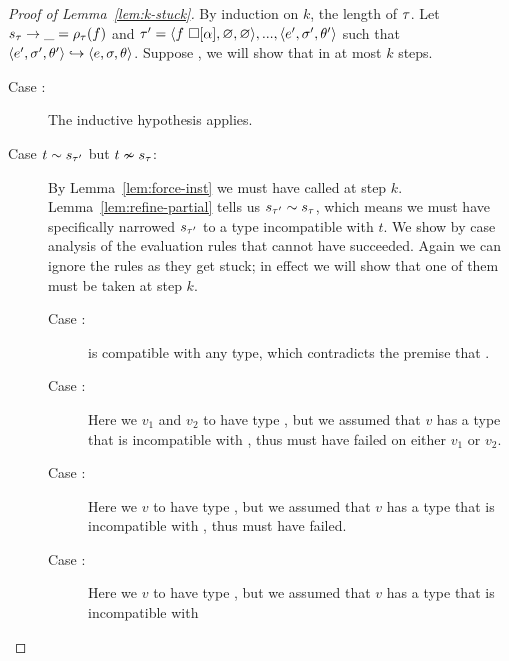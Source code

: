\begin{proof}[Proof of Lemma~\ref{lem:k-stuck}]
  By induction on $k$, the length of $\tau$. Let $s_{\tau} \rightarrow \_ = \rho_{\tau}(f)$ and
  $\tau' = \langle f\ \square[\alpha], \varnothing, \varnothing \rangle,...,\langle e', \sigma', \theta' \rangle$
  such that $\langle e', \sigma', \theta' \rangle \hookrightarrow \langle e, \sigma, \theta \rangle$.
  Suppose , we
  will show that 
  in at most $k$ steps.


  \begin{description}
  \item [Case :]
    The inductive hypothesis applies.
  \item [Case $t \sim s_{\tau'}$ but $t \nsim s_{\tau}$:]
    By Lemma~\ref{lem:force-inst} we must have called \forcesym at step
    $k$.
    Lemma~\ref{lem:refine-partial} tells us
    $s_{\tau'} \sim s_{\tau}$, which means we must have
    specifically narrowed $s_{\tau'}$ to a type incompatible with $t$.
    We show by case analysis of the evaluation rules that \forcesym
    cannot have succeeded. Again we can ignore the 
    rules as they get stuck; in effect we will show that one of them
    must be taken at step $k$.
    \begin{description}
    \item[Case \reholegood:] \thole is compatible with any type, which
      contradicts the premise that .
    \item[Case \replusgood:] Here we \forcesym $v_1$ and $v_2$ to have type
      \tint, but we assumed that $v$ has a type that is incompatible with
      \tint, thus \forcesym must have failed on either $v_1$ or $v_2$.
    \item[Case :] Here we \forcesym $v$ to have type
      \tbool, but we assumed that $v$ has a type that is incompatible with
      \tbool, thus \forcesym must have failed.
    \item[Case \reappgood:] Here we \forcesym $v$ to have type
      \tfun, but we assumed that $v$ has a type that is incompatible with

\end{description}
\end{description}
\end{proof}
